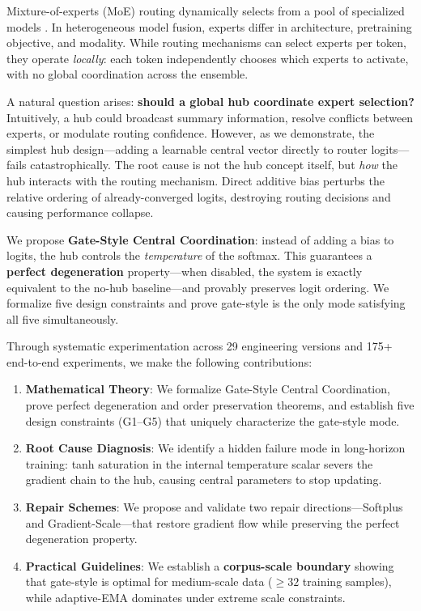\documentclass[10pt,twoside]{article}
\theoremstyle{definition}
\begin{document}
Mixture-of-experts (MoE) routing dynamically selects from a pool of specialized models \citep{shazeerOutrageouslyLargeNeural2017}. In heterogeneous model fusion, experts differ in architecture, pretraining objective, and modality. While routing mechanisms can select experts per token, they operate \textit{locally}: each token independently chooses which experts to activate, with no global coordination across the ensemble.

A natural question arises: \textbf{should a global hub coordinate expert selection?} Intuitively, a hub could broadcast summary information, resolve conflicts between experts, or modulate routing confidence. However, as we demonstrate, the simplest hub design---adding a learnable central vector directly to router logits---fails catastrophically. The root cause is not the hub concept itself, but \textit{how} the hub interacts with the routing mechanism. Direct additive bias perturbs the relative ordering of already-converged logits, destroying routing decisions and causing performance collapse.

We propose \textbf{Gate-Style Central Coordination}: instead of adding a bias to logits, the hub controls the \textit{temperature} of the softmax. This guarantees a \textbf{perfect degeneration} property---when disabled, the system is exactly equivalent to the no-hub baseline---and provably preserves logit ordering. We formalize five design constraints and prove gate-style is the only mode satisfying all five simultaneously.

Through systematic experimentation across 29 engineering versions and 175+ end-to-end experiments, we make the following contributions:

\begin{enumerate}
    \item \textbf{Mathematical Theory}: We formalize Gate-Style Central Coordination, prove perfect degeneration and order preservation theorems, and establish five design constraints (G1--G5) that uniquely characterize the gate-style mode.
    \item \textbf{Root Cause Diagnosis}: We identify a hidden failure mode in long-horizon training: tanh saturation in the internal temperature scalar severs the gradient chain to the hub, causing central parameters to stop updating.
    \item \textbf{Repair Schemes}: We propose and validate two repair directions---Softplus and Gradient-Scale---that restore gradient flow while preserving the perfect degeneration property.
    \item \textbf{Practical Guidelines}: We establish a \textbf{corpus-scale boundary} showing that gate-style is optimal for medium-scale data ($\geq 32$ training samples), while adaptive-EMA dominates under extreme scale constraints.
\end{enumerate}
\end{document}

